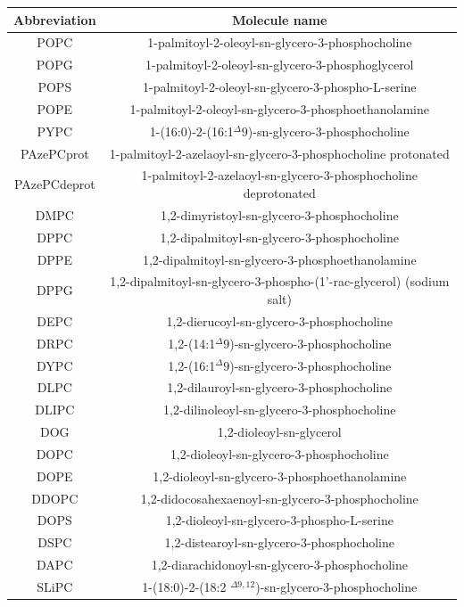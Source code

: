 \documentclass[fleqn,10pt]{wlscirep}
\begin{document}
\begin{table}[h]
    \centering
    \begin{tabular}{c c}
        Abbreviation & Molecule name \\
        \hline
POPC &  1-palmitoyl-2-oleoyl-sn-glycero-3-phosphocholine  \\
POPG &  1-palmitoyl-2-oleoyl-sn-glycero-3-phosphoglycerol \\
POPS & 1-palmitoyl-2-oleoyl-sn-glycero-3-phospho-L-serine \\
POPE & 1-palmitoyl-2-oleoyl-sn-glycero-3-phosphoethanolamine \\
PYPC & 1-(16:0)-2-(16:1$^\Delta9$)-sn-glycero-3-phosphocholine \\
PAzePCprot & 1-palmitoyl-2-azelaoyl-sn-glycero-3-phosphocholine protonated \\
PAzePCdeprot & 1-palmitoyl-2-azelaoyl-sn-glycero-3-phosphocholine deprotonated \\
DMPC & 1,2-dimyristoyl-sn-glycero-3-phosphocholine \\
DPPC & 1,2-dipalmitoyl-sn-glycero-3-phosphocholine \\
DPPE & 1,2-dipalmitoyl-sn-glycero-3-phosphoethanolamine \\
DPPG & 1,2-dipalmitoyl-sn-glycero-3-phospho-(1'-rac-glycerol) (sodium salt) \\
DEPC & 1,2-dierucoyl-sn-glycero-3-phosphocholine \\
DRPC & 1,2-(14:1$^\Delta9$)-sn-glycero-3-phosphocholine \\
DYPC & 1,2-(16:1$^\Delta9$)-sn-glycero-3-phosphocholine \\
DLPC & 1,2-dilauroyl-sn-glycero-3-phosphocholine \\
DLIPC& 1,2-dilinoleoyl-sn-glycero-3-phosphocholine \\
DOG  & 1,2-dioleoyl-sn-glycerol \\
DOPC & 1,2-dioleoyl-sn-glycero-3-phosphocholine \\
DOPE & 1,2-dioleoyl-sn-glycero-3-phosphoethanolamine \\
DDOPC& 1,2-didocosahexaenoyl-sn-glycero-3-phosphocholine \\
DOPS & 1,2-dioleoyl-sn-glycero-3-phospho-L-serine \\
DSPC & 1,2-distearoyl-sn-glycero-3-phosphocholine \\
DAPC & 1,2-diarachidonoyl-sn-glycero-3-phosphocholine \\
SLiPC & 1-(18:0)-2-(18:2 $^{\Delta9,12}$)-sn-glycero-3-phosphocholine  \\

\end{tabular}
\end{table}
\end{document}
